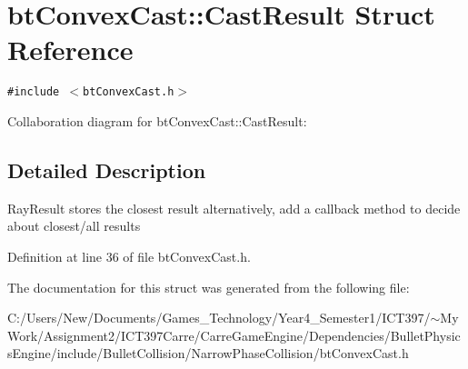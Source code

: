 \hypertarget{structbt_convex_cast_1_1_cast_result}{
\section{btConvexCast::CastResult Struct Reference}
\label{structbt_convex_cast_1_1_cast_result}
}
{\tt \#include $<$btConvexCast.h$>$}

Collaboration diagram for btConvexCast::CastResult:

\subsection{Detailed Description}
RayResult stores the closest result alternatively, add a callback method to decide about closest/all results 

Definition at line 36 of file btConvexCast.h.

The documentation for this struct was generated from the following file:\begin{CompactItemize}
\item 
C:/Users/New/Documents/Games\_\-Technology/Year4\_\-Semester1/ICT397/$\sim$My Work/Assignment2/ICT397Carre/CarreGameEngine/Dependencies/BulletPhysicsEngine/include/BulletCollision/NarrowPhaseCollision/btConvexCast.h\end{CompactItemize}

